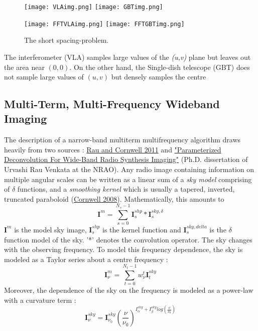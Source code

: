 \documentclass{article}
\begin{document}
\begin{figure}
\centering
\begin{minipage}[b]{.35\textwidth}
\texttt{[image: VLAimg.png]}
\texttt{[image: GBTimg.png]}
\end{minipage}%
\begin{minipage}[b]{.35\linewidth}
\texttt{[image: FFTVLAimg.png]}
\texttt{[image: FFTGBTimg.png]}
\end{minipage}
\caption{The short spacing-problem.}
\label{4}
\end{figure}
The interferometer (VLA) samples large values of the \textit{(u,v)} plane but leaves out the area near $(0,0)$. On the other hand, the Single-dish telescope (GBT) does not sample large values of $(u,v)$ but densely samples the centre
\label{section2.2}\subsection{Multi-Term, Multi-Frequency Wideband Imaging}
	The description of a narrow-band multiterm multifrequency algorithm draws heavily from two sources : \hyperref[urvpaper]{Rau and Cornwell 2011} and \hyperref[urvthesis]{"Parameterized Deconvolution For Wide-Band
Radio Synthesis Imaging"} (Ph.D. dissertation of Urvashi Rau Venkata at the NRAO).
Any radio image containing information on multiple angular scales can be written as a linear sum of a \textit{sky model} comprising of $\delta$ functions, and a \textit{smoothing kernel} which is usually a tapered, inverted, truncated paraboloid (\hyperref[cornwell2008]{Cornwell 2008}). Mathematically, this amounts to
\begin{equation}
\textbf{I}^{m} = \sum_{s=0}^{N_s-1}\textbf{I}_s^{shp} * \textbf{I}_s^{sky, \delta}
\end{equation} 
$\textbf{I}^{m}$ is the model sky image, $\textbf{I}_s^{shp}$ is the kernel function and $\textbf{I}_s^{sky, delta}$ is the $\delta$ function model of the sky. '*' denotes the convolution operator.
The sky changes with the observing frequency. To model this frequency dependence, the sky is modeled as a Taylor series about a centre frequency : 
\begin{equation}
\textbf{I}_\nu^{m} = \sum_{t=0}^{N_t-1}w_\nu^{t}\textbf{I}_t^{sky}
\end{equation}
Moreover, the dependence of the sky on the frequency is modeled as a power-law with a curvature term : 
\begin{equation}
\textbf{I}^{sky}_\nu = \textbf{I}^{sky}_{\nu_0}{(\frac{\nu}{\nu_0})}^{{I}^{sky}_\alpha + {I}^{sky}_\beta log(\frac{\nu}{\nu_0})}
\end{equation}
\end{document}
